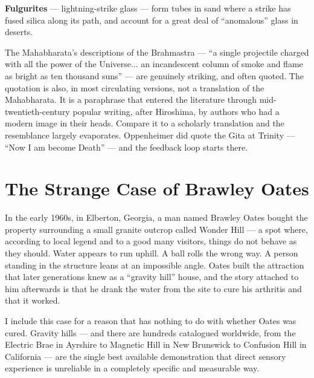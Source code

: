 \textbf{Fulgurites} --- lightning-strike glass --- form tubes in sand where a strike has fused
silica along its path, and account for a great deal of ``anomalous'' glass in deserts.

\begin{funfact}
The Mahabharata's descriptions of the Brahmastra --- ``a single projectile charged with all the
power of the Universe... an incandescent column of smoke and flame as bright as ten thousand
suns'' --- are genuinely striking, and often quoted. The quotation is also, in most circulating
versions, not a translation of the Mahabharata. It is a paraphrase that entered the literature
through mid-twentieth-century popular writing, after Hiroshima, by authors who had a modern
image in their heads. Compare it to a scholarly translation and the resemblance largely
evaporates. Oppenheimer did quote the Gita at Trinity --- ``Now I am become Death'' --- and the
feedback loop starts there.
\end{funfact}

\section{The Strange Case of Brawley Oates}\label{sec:strangecasebrawleyoates}

In the early 1960s, in Elberton, Georgia, a man named Brawley Oates bought the property
surrounding a small granite outcrop called Wonder Hill --- a spot where, according to local
legend and to a good many visitors, things do not behave as they should. Water appears to run
uphill. A ball rolls the wrong way. A person standing in the structure leans at an impossible
angle. Oates built the attraction that later generations knew as a ``gravity hill'' house, and
the story attached to him afterwards is that he drank the water from the site to cure his
arthritis and that it worked.

I include this case for a reason that has nothing to do with whether Oates was cured. Gravity
hills --- and there are hundreds catalogued worldwide, from the Electric Brae in Ayrshire to
Magnetic Hill in New Brunswick to Confusion Hill in California --- are the single best available
demonstration that direct sensory experience is unreliable in a completely specific and
measurable way.


